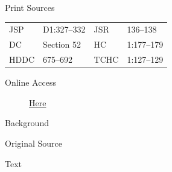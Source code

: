 			\begin{description}
				\item[Print Sources]
			\end{description}

				\begin{tabular}{p{0.5in}p{1in}p{0.5in}p{1in}}
				JSP	 	& D1:327--332	& JSR 		& 136--138 \\
				DC	 	& Section 52 	& HC 		& 1:177--179 \\
				HDDC 	& 675--692		& TCHC 		& 1:127--129 \\
				\end{tabular}
			
			\begin{description}
				\item[Online Access] \href{https://www.josephsmithpapers.org/paper-summary/revelation-6-june-1831-dc-52/1}{Here}
			\end{description}
			
			\begin{description}
				\item[Background]
			\end{description}
			
			
			\begin{description}
				\item[Original Source]
			\end{description}
			
			
			\begin{description}
				\item[Text]
			\end{description}
			
